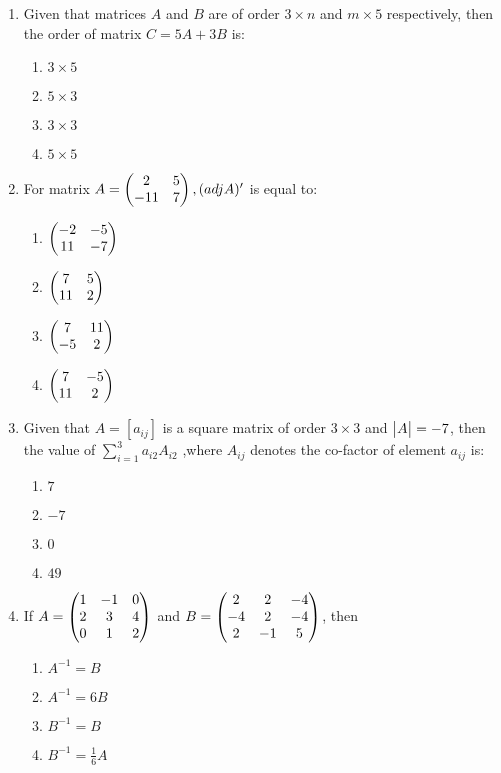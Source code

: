 \documentclass{article}
\begin{document}
\begin{enumerate}
    \item Given that matrices $A$ and $B$ are of order $3 \times n$ and $m \times 5$ respectively, then the order of matrix $C = 5A + 3B$ is:
    \begin{enumerate}
        \item $ 3 \times 5$ 
        \item $ 5 \times 3$ 
        \item $ 3 \times 3$ 
        \item $ 5 \times 5$
    \end{enumerate}

    \item For matrix $A = \begin{pmatrix}2 & 5 \\ -11 & 7\end{pmatrix}, (adj A)'$ is equal to:
    \begin{enumerate}
        \item $\begin{pmatrix}-2 & -5 \\ 11 & -7\end{pmatrix}$
        \item $\begin{pmatrix}7 & 5 \\ 11 & 2\end{pmatrix}$
        \item $\begin{pmatrix}7 & 11 \\ -5 & 2\end{pmatrix}$
        \item $\begin{pmatrix}7 & -5 \\ 11 & 2\end{pmatrix}$
    \end{enumerate}

    \item Given that $A = [a_{ij}]$ is a square matrix of order $3 \times 3$ and $\begin{vmatrix}A\end{vmatrix} = -7$, then the value of  $\sum_{i=1}^{3} a_{i2}A_{i2}$ ,where $A_{ij}$ denotes the co-factor of element $a_{ij}$ is:

    \begin{enumerate}
        \item $7$
        \item $-7$
        \item $0$
        \item $49$
    \end{enumerate}

    \item If $A =\begin{pmatrix}1 &-1 & 0 \\2&3 & 4 \\0&1&2\end{pmatrix}$ and $B = \begin{pmatrix}2&2&-4\\-4&2&-4\\2&-1&5\end{pmatrix}$, then
    \begin{enumerate}
        \item $A^{-1} = B$
        \item $A^{-1} = 6B$
        \item $B^{-1} = B$
        \item $B^{-1} = \frac{1}{6} A$
    \end{enumerate}
    

\end{enumerate}
\end{document}
